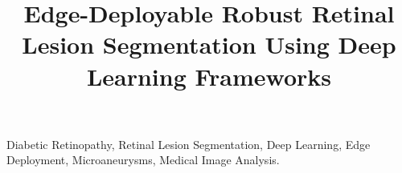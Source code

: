 \documentclass[conference]{IEEEtran}
\begin{document}
\title{Edge-Deployable Robust Retinal Lesion Segmentation Using Deep Learning Frameworks\\}

\author{
}


\maketitle



\begin{IEEEkeywords}
Diabetic Retinopathy, Retinal Lesion Segmentation, Deep Learning, Edge Deployment, Microaneurysms, Medical Image Analysis.
\end{IEEEkeywords}













\end{document}
